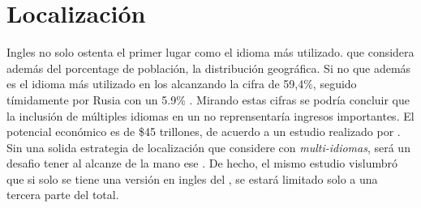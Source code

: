 




\section{Localización}

Ingles no solo ostenta el primer lugar como el idioma más utilizado. \rankingCPT que considera además del porcentage de población, la distribución geográfica. Si no que además es el idioma más utilizado en los \websitesINT alcanzando la cifra de 59,4\%, seguido tímidamente por Rusia con un 5.9\% \cite{online_world_wide_languages}. Mirando estas cifras se podría concluir que la inclusión de múltiples idiomas en un \siteINT \ecommerceCOM	no reprensentaría ingresos importantes.
El potencial económico \online es de \$45 trillones, de acuerdo a un estudio realizado por \commonSenseAdvisoryNAME \cite{online_world_global_oportunity_multi_languages}.  Sin una solida estrategia de localización que considere \websitesINT \ecommerceCOM con \textit{multi-idiomas}, será  un desafio tener al alcanze de la mano ese \revenueCOM. De hecho, el mismo estudio vislumbró que si solo se tiene una versión en ingles del \siteINT, se estará limitado solo a una tercera parte del total.


